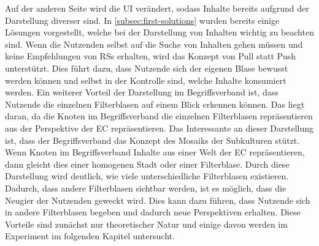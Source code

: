 Auf der anderen Seite wird die \ac{UI} verändert, sodass Inhalte bereits aufgrund der Darstellung diverser sind.
In \autoref{subsec:first-solutions} wurden bereits einige Lösungen vorgestellt, welche bei der Darstellung von Inhalten wichtig zu beachten sind.
Wenn die Nutzenden selbst auf die Suche von Inhalten gehen müssen und keine Empfehlungen von \acp{RS} erhalten, wird das Konzept von Pull statt Push unterstützt.
Dies führt dazu, dass Nutzende sich der eigenen Blase bewusst werden können und selbst in der Kontrolle sind, welche Inhalte konsumiert werden.
Ein weiterer Vorteil der Darstellung im Begriffsverband ist, dass Nutzende die einzelnen Filterblasen auf einem Blick erkennen können.
Das liegt daran, da die Knoten im Begriffsverband die einzelnen Filterblasen repräsentieren aus der Perspektive der \ac{EC} repräsentieren.
Das Interessante an dieser Darstellung ist, dass der Begriffsverband das Konzept des Mosaiks der Subkulturen stützt. \\

Wenn Knoten im Begriffsverband Inhalte aus einer Welt der \ac{EC} repräsentieren, dann gleicht dies einer homogenen Stadt oder einer Filterblase.
Durch diese Darstellung wird deutlich, wie viele unterschiedliche Filterblasen existieren.
Dadurch, dass andere Filterblasen sichtbar werden, ist es möglich, dass die Neugier der Nutzenden geweckt wird.
Dies kann dazu führen, dass Nutzende sich in andere Filterblasen begeben und dadurch neue Perspektiven erhalten.
Diese Vorteile sind zunächst nur theoretischer Natur und einige davon werden im Experiment im folgenden Kapitel untersucht.
